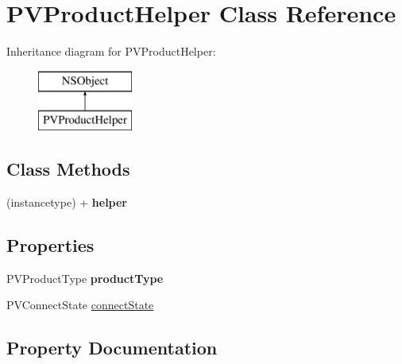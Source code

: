 \hypertarget{interface_p_v_product_helper}{}\section{P\+V\+Product\+Helper Class Reference}
\label{interface_p_v_product_helper}
Inheritance diagram for P\+V\+Product\+Helper\+:\begin{figure}[H]
\begin{center}
\leavevmode
\includegraphics[height=2.000000cm]{interface_p_v_product_helper}
\end{center}
\end{figure}
\subsection*{Class Methods}
\begin{DoxyCompactItemize}
\item 
\mbox{\label{interface_p_v_product_helper_aeaf3807598731748759b30326e59d8a7}} 
(instancetype) + {\bfseries helper}
\end{DoxyCompactItemize}
\subsection*{Properties}
\begin{DoxyCompactItemize}
\item 
\mbox{\label{interface_p_v_product_helper_acddbccc6784b78432e6e7a5025c6a0b4}} 
P\+V\+Product\+Type {\bfseries product\+Type}
\item 
P\+V\+Connect\+State \hyperlink{interface_p_v_product_helper_a9149458eedf71145e3f9c928d57472db}{connect\+State}
\end{DoxyCompactItemize}


\subsection{Property Documentation}
\mbox{\label{interface_p_v_product_helper_a9149458eedf71145e3f9c928d57472db}} 
